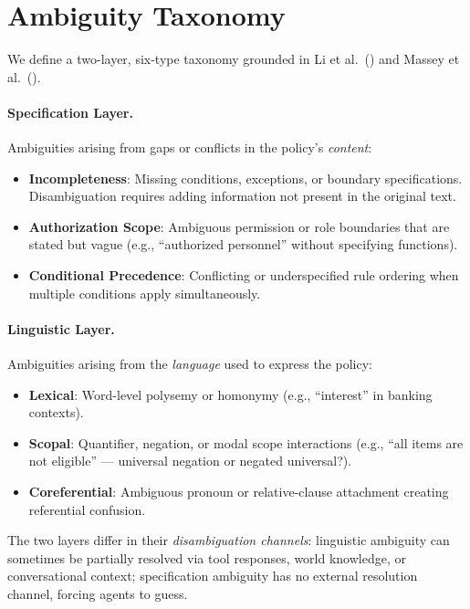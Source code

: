 \documentclass[11pt,a4paper]{article}
\begin{document}
\section{Ambiguity Taxonomy}
\label{sec:taxonomy}

We define a two-layer, six-type taxonomy grounded in Li et al.~(\citeyear{li2024drip}) and Massey et al.~(\citeyear{massey2014evaluating}).

\paragraph{Specification Layer.}
Ambiguities arising from gaps or conflicts in the policy's \emph{content}:
\begin{itemize}
\item \textbf{Incompleteness}: Missing conditions, exceptions, or boundary specifications. Disambiguation requires adding information not present in the original text.
\item \textbf{Authorization Scope}: Ambiguous permission or role boundaries that are stated but vague (e.g., ``authorized personnel'' without specifying functions).
\item \textbf{Conditional Precedence}: Conflicting or underspecified rule ordering when multiple conditions apply simultaneously.
\end{itemize}

\paragraph{Linguistic Layer.}
Ambiguities arising from the \emph{language} used to express the policy:
\begin{itemize}
\item \textbf{Lexical}: Word-level polysemy or homonymy (e.g., ``interest'' in banking contexts).
\item \textbf{Scopal}: Quantifier, negation, or modal scope interactions (e.g., ``all items are not eligible'' --- universal negation or negated universal?).
\item \textbf{Coreferential}: Ambiguous pronoun or relative-clause attachment creating referential confusion.
\end{itemize}

The two layers differ in their \emph{disambiguation channels}: linguistic ambiguity can sometimes be partially resolved via tool responses, world knowledge, or conversational context; specification ambiguity has no external resolution channel, forcing agents to guess.
\end{document}
